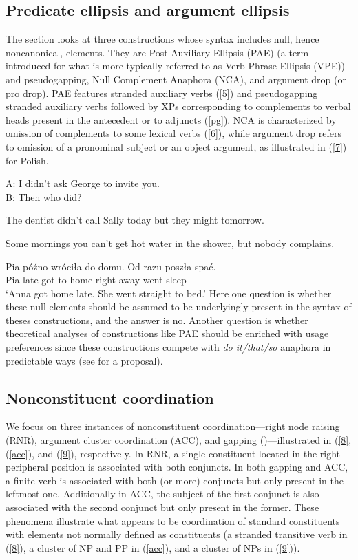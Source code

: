 \documentclass[output=paper
                ,modfonts
                ,nonflat
	        ,collection
	        ,collectionchapter
	        ,collectiontoclongg
 	        ,biblatex
                ,babelshorthands
                ,newtxmath
                ,draftmode
                ,colorlinks, citecolor=brown
]{./langsci/langscibook}
\begin{document}
{\subsection{Predicate ellipsis and argument ellipsis}
The section looks at three constructions whose syntax includes null, hence noncanonical, elements. They are Post-Auxiliary Ellipsis (PAE) (a term \citep{Sag1976} introduced for what is more typically referred to as Verb Phrase Ellipsis (VPE)) and pseudogapping, Null Complement Anaphora (NCA), and argument drop (or pro drop). PAE features stranded auxiliary verbs (\ref{5}) and pseudogapping stranded auxiliary verbs followed by XPs corresponding to complements to verbal heads present in the antecedent or to adjuncts (\ref{pg}). NCA is characterized by omission of complements to some lexical verbs (\ref{6}), while argument drop refers to omission of a pronominal subject or an object argument, as illustrated in (\ref{7}) for Polish.

\ea A: I didn't ask George to invite you.\\B: Then who did?\label{5}\z

\ea The dentist didn't call Sally today but they might tomorrow. \label{pg}\z

\ea Some mornings you can't get hot water in the shower, but nobody complains. \label{6} \z

\ea
\gll Pia p\'{o}\'{z}no wr\'{o}ci\l a do domu. Od razu posz\l a spa\'{c}.\\
Pia late got to home right away went sleep\\
\glt `Anna got home late. She went straight to bed.'
\label{7}
\z
Here one question is whether these null elements should be assumed to be underlyingly present in the syntax of theses constructions, and the answer is no. Another question is whether theoretical analyses of constructions like PAE should be enriched with usage preferences since these constructions compete with \textit{do it/that/so} anaphora in predictable ways (see \citealt{Miller2013} for a proposal).


\subsection{Nonconstituent coordination}

We focus on three instances of nonconstituent coordination---right node raising (RNR), argument cluster coordination (ACC), and gapping (\citealt{Ross 1967})---illustrated in (\ref{8}, (\ref{acc}), and (\ref{9}), respectively. In RNR, a single constituent located in the right-peripheral position is associated with both conjuncts. In both gapping and ACC, a finite verb is associated with both (or more) conjuncts but only present in the leftmost one. Additionally in ACC, the subject of the first conjunct is also associated with the second conjunct but only present in the former. These phenomena illustrate what appears to be coordination of standard constituents with elements not normally defined as constituents (a stranded transitive verb in (\ref{8}), a cluster of NP and PP in (\ref{acc}), and a cluster of NPs in (\ref{9})).

}
\end{document}
